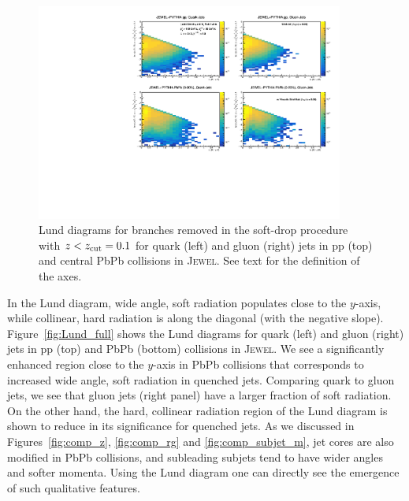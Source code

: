 \documentclass[notoc,preprintnumbers]{JHEP3}
\begin{document}
\begin{figure}[t]
	\centering
	\includegraphics[width=0.9\textwidth]{plots/Individual_LundDiagrams_zrel_background.pdf}
	\caption{Lund diagrams for branches removed in the soft-drop procedure with $z<z_{\rm cut}=0.1$ for quark (left) and gluon (right) jets in pp (top) and central PbPb collisions in \textsc{Jewel}. See text for the definition of the axes.}
\label{fig:Lund_bkg}
\end{figure}

In the Lund diagram, wide angle, soft radiation populates close to the $y$-axis, while collinear, hard radiation is along the diagonal (with the negative slope). Figure~\ref{fig:Lund_full} shows the Lund diagrams for quark (left) and gluon (right) jets in pp (top) and PbPb (bottom) collisions in \textsc{Jewel}. We see a significantly enhanced region close to the $y$-axis in PbPb collisions that corresponds to increased wide angle, soft radiation in quenched jets. Comparing quark to gluon jets, we see that gluon jets (right panel) have a larger fraction of soft radiation. On the other hand, the hard, collinear radiation region of the Lund diagram is shown to reduce in its significance for quenched jets. As we discussed in Figures~\ref{fig:comp_z}, \ref{fig:comp_rg} and \ref{fig:comp_subjet_m}, jet cores are also modified in PbPb collisions, and subleading subjets tend to have wider angles and softer momenta. Using the Lund diagram one can directly see the emergence of such qualitative features.
\end{document}
